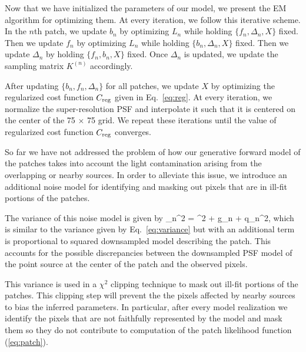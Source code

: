 Now that we have initialized the parameters of our model, we present the EM algorithm for optimizing them. At every iteration, we follow this 
iterative scheme. In the $n$th patch, we update $b_n$ by optimizing $L_n$ while holding $\{f_n, \Delta_n, X\}$ fixed. Then 
we update $f_n$ by optimizing $L_n$ while holding $\{b_n, \Delta_n, X\}$ fixed. Then we update $\Delta_n$ by holding $\{f_n, b_n, X\}$ fixed. 
Once $\Delta_n$ is updated, we update the sampling matrix $K^{(n)}$ accordingly. 

After updating $\{b_n, f_n, \Delta_n\}$ for all patches, we update $X$ 
by optimizing the regularized cost function $C_{\rm reg}$ given in Eq.~\ref{eq:reg}. At every iteration, we normalize the super-resolution PSF and 
interpolate it such that it is centered on the center of the 75 $\times$ 75 grid. We repeat these iterations until the value of regularized cost function 
$C_{\rm reg}$ converges.


So far we have not addressed the problem of how our generative forward model of the patches takes into account the light contamination arising from 
the overlapping or nearby sources. In order to alleviate this issue, we introduce an additional noise model for identifying and masking out pixels that are 
in ill-fit portions of the patches.

The variance of this noise model is given by
\beq
{}_n^2 = \sigma^{2} + g_{n} + q_{n}^{2},
\label{eq:modified_variance}
\eeq 
which is similar to the variance given by Eq.~\ref{eq:variance} but with an additional term is 
proportional to squared downsampled model describing the patch. This accounts for the possible discrepancies between the downsampled PSF model of the 
point source at the center of the patch and the observed pixels. 

This variance is used in a $\chi^2$ clipping technique to mask out ill-fit portions of the patches. 
This clipping step will prevent the the pixels affected by nearby sources to bias the inferred parameters.
In particular, after every model realization we identify the pixels that are not faithfully represented by the model and mask them so they do not 
contribute to computation of the patch likelihood function (\ref{eq:patch}).
 
